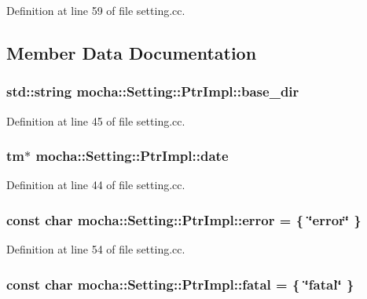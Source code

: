 Definition at line 59 of file setting.cc.



\subsection{Member Data Documentation}
\hypertarget{classmocha_1_1_setting_1_1_ptr_impl_a5f948e7b0df7583a113ab5fa6c228afa}{
\subsubsection[{base\_\-dir}]{\setlength{\rightskip}{0pt plus 5cm}std::string {\bf mocha::Setting::PtrImpl::base\_\-dir}}}
\label{classmocha_1_1_setting_1_1_ptr_impl_a5f948e7b0df7583a113ab5fa6c228afa}


Definition at line 45 of file setting.cc.

\hypertarget{classmocha_1_1_setting_1_1_ptr_impl_a222a92c2db05a720480fba0058811897}{
\subsubsection[{date}]{\setlength{\rightskip}{0pt plus 5cm}tm$\ast$ {\bf mocha::Setting::PtrImpl::date}}}
\label{classmocha_1_1_setting_1_1_ptr_impl_a222a92c2db05a720480fba0058811897}


Definition at line 44 of file setting.cc.

\hypertarget{classmocha_1_1_setting_1_1_ptr_impl_a8d10834172c72d9864d7504b61849663}{
\subsubsection[{error}]{\setlength{\rightskip}{0pt plus 5cm}const char {\bf mocha::Setting::PtrImpl::error} = \{ \char`\"{}error\char`\"{} \}}}
\label{classmocha_1_1_setting_1_1_ptr_impl_a8d10834172c72d9864d7504b61849663}


Definition at line 54 of file setting.cc.

\hypertarget{classmocha_1_1_setting_1_1_ptr_impl_aea6af2d60173b965ab3b3b05b35f8e76}{
\subsubsection[{fatal}]{\setlength{\rightskip}{0pt plus 5cm}const char {\bf mocha::Setting::PtrImpl::fatal} = \{ \char`\"{}fatal\char`\"{} \}}}
\label{classmocha_1_1_setting_1_1_ptr_impl_aea6af2d60173b965ab3b3b05b35f8e76}


